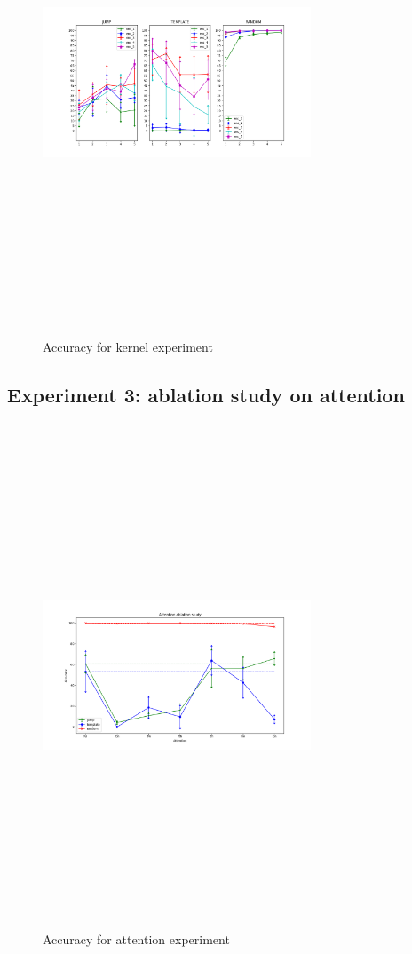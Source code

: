 \begin{figure}[h]
    \centering
    \includegraphics[width=80mm, height=150mm,keepaspectratio]{figures/kernel_exp.png}
    \caption{Accuracy for kernel experiment}
    \label{fig:kernel_exp}
\end{figure}

\subsection{Experiment 3: ablation study on attention}
\label{subsec:exp3}

\begin{figure}[h]
    \centering
    \includegraphics[width=80mm, height=150mm,keepaspectratio]{figures/attention_exp.png}
    \caption{Accuracy for attention experiment}
    \label{fig:attention_exp}
\end{figure}


